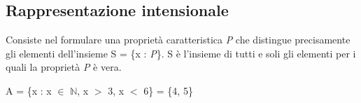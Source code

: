 \subsection{Rappresentazione intensionale}
Consiste nel formulare una proprietà caratteristica \textit{P} che distingue precisamente gli elementi dell'insieme S = \{x : \textit{P}\}. S è l'insieme di tutti e soli gli elementi per i quali la proprietà \textit{P} è vera. \\
\begin{center}
    A = \{x : x $\in$ $\mathbb{N}$, x $>$ 3, x $<$ 6\} = \{4, 5\}
\end{center}
